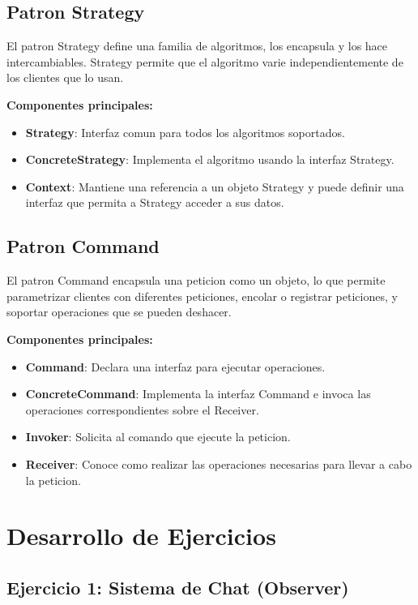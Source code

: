 \documentclass[11pt,a4paper]{article}
\begin{document}
\subsection{Patron Strategy}

El patron Strategy define una familia de algoritmos, los encapsula y los hace intercambiables. Strategy permite que el algoritmo varie independientemente de los clientes que lo usan.

\textbf{Componentes principales:}
\begin{itemize}
    \item \textbf{Strategy}: Interfaz comun para todos los algoritmos soportados.
    \item \textbf{ConcreteStrategy}: Implementa el algoritmo usando la interfaz Strategy.
    \item \textbf{Context}: Mantiene una referencia a un objeto Strategy y puede definir una interfaz que permita a Strategy acceder a sus datos.
\end{itemize}

\subsection{Patron Command}

El patron Command encapsula una peticion como un objeto, lo que permite parametrizar clientes con diferentes peticiones, encolar o registrar peticiones, y soportar operaciones que se pueden deshacer.

\textbf{Componentes principales:}
\begin{itemize}
    \item \textbf{Command}: Declara una interfaz para ejecutar operaciones.
    \item \textbf{ConcreteCommand}: Implementa la interfaz Command e invoca las operaciones correspondientes sobre el Receiver.
    \item \textbf{Invoker}: Solicita al comando que ejecute la peticion.
    \item \textbf{Receiver}: Conoce como realizar las operaciones necesarias para llevar a cabo la peticion.
\end{itemize}

\section{Desarrollo de Ejercicios}

\subsection{Ejercicio 1: Sistema de Chat (Observer)}
\end{document}
